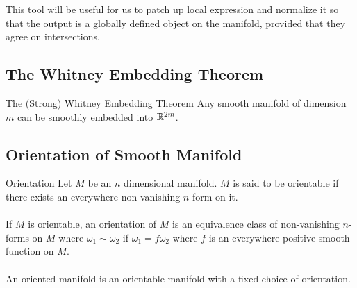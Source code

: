 \documentclass[a4paper]{article}
\begin{document}
This tool will be useful for us to patch up local expression and normalize it so that the output is a globally defined object on the manifold, provided that they agree on intersections. 

\subsection{The Whitney Embedding Theorem}
\begin{thm}{The (Strong) Whitney Embedding Theorem}{} Any smooth manifold of dimension $m$ can be smoothly embedded into $\mathbb{R}^{2m}$. 
\end{thm}

\subsection{Orientation of Smooth Manifold}
\begin{defn}{Orientation}{} Let $M$ be an $n$ dimensional manifold. $M$ is said to be orientable if there exists an everywhere non-vanishing $n$-form on it. \\~\\
If $M$ is orientable, an orientation of $M$ is an equivalence class of non-vanishing $n$-forms on $M$ where $\omega_1\sim\omega_2$ if $\omega_1=f\omega_2$ where $f$ is an everywhere positive smooth function on $M$. \\~\\
An oriented manifold is an orientable manifold with a fixed choice of orientation. 
\end{defn}
\end{document}
